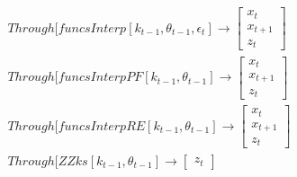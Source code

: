 \documentclass[12pt]{article}
\begin{document}
 \begin{gather}
 Through[funcsInterp[k_{t-1},\theta_{t-1},\epsilon_t] \rightarrow
 \begin{bmatrix}
   x_t\\x_{t+1}\\z_t
 \end{bmatrix}
 \\
 Through[funcsInterpPF[k_{t-1},\theta_{t-1}]\rightarrow
 \begin{bmatrix}
   x_t\\x_{t+1}\\z_t
 \end{bmatrix}
\\
 Through[funcsInterpRE[k_{t-1},\theta_{t-1}]\rightarrow
 \begin{bmatrix}
   x_t\\x_{t+1}\\z_t
 \end{bmatrix}
\\
 Through[ZZks[k_{t-1},\theta_{t-1}]\rightarrow
 \begin{bmatrix}
z_t
 \end{bmatrix}
\\
 \end{gather}



\end{document}
